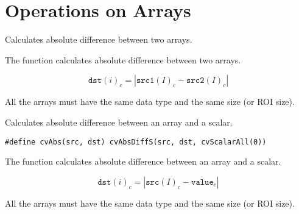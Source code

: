 \section{Operations on Arrays}


\ifCPy

Calculates absolute difference between two arrays.


\begin{description}
\end{description}

The function calculates absolute difference between two arrays.

\[ \texttt{dst}(i)_c = |\texttt{src1}(I)_c - \texttt{src2}(I)_c| \]

All the arrays must have the same data type and the same size (or ROI size).

Calculates absolute difference between an array and a scalar.

\ifC
\begin{lstlisting}
#define cvAbs(src, dst) cvAbsDiffS(src, dst, cvScalarAll(0))
\end{lstlisting}
\fi
\begin{description}
\end{description}

The function calculates absolute difference between an array and a scalar.

\[ \texttt{dst}(i)_c = |\texttt{src}(I)_c - \texttt{value}_c| \]

All the arrays must have the same data type and the same size (or ROI size).


